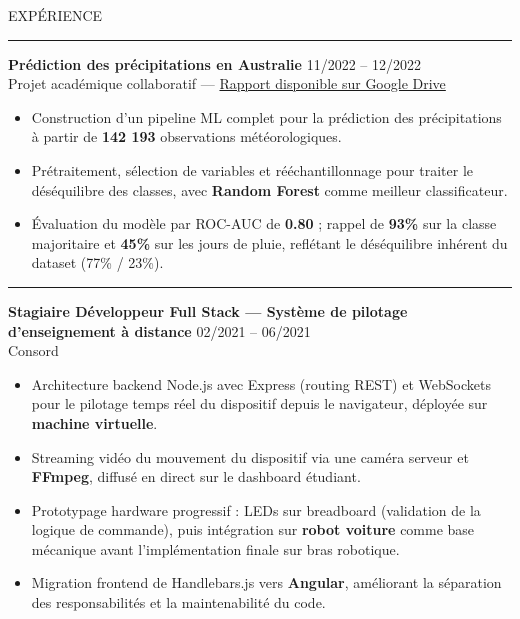 \documentclass{resume}
\begin{document}
\begin{rSection}{EXPÉRIENCE}
\vspace{0.05cm}
\noindent\rule{\textwidth}{0.2pt}
\vspace{0.05cm}

{\bf Prédiction des précipitations en Australie} \hfill {11/2022 -- 12/2022}\\
Projet académique collaboratif — \href{https://drive.google.com/file/d/1Tg2m_nWeunxjzOVvIv6D_lKAPd-I-wrp/view?usp=sharing}{Rapport disponible sur Google Drive}
\begin{itemize}
    \item Construction d’un pipeline ML complet pour la prédiction des précipitations à partir de \textbf{142 193} observations météorologiques.
    \item Prétraitement, sélection de variables et rééchantillonnage pour traiter le déséquilibre des classes, avec \textbf{Random Forest} comme meilleur classificateur.
    \item Évaluation du modèle par ROC-AUC de \textbf{0.80} ; rappel de \textbf{93\%} sur
      la classe majoritaire et \textbf{45\%} sur les jours de pluie,
      reflétant le déséquilibre inhérent du dataset (77\% / 23\%).
\end{itemize}

\vspace{0.05cm}
\noindent\rule{\textwidth}{0.2pt}
\vspace{0.05cm}

{\small\bfseries Stagiaire Développeur Full Stack — Système de pilotage d'enseignement à distance} \hfill {02/2021 -- 06/2021}\\
Consord
\begin{itemize}
    \item Architecture backend Node.js avec Express (routing REST) et WebSockets pour le
          pilotage temps réel du dispositif depuis le navigateur, déployée sur \textbf{machine virtuelle}.
    \item Streaming vidéo du mouvement du dispositif via une caméra serveur et \textbf{FFmpeg},
          diffusé en direct sur le dashboard étudiant.
    \item Prototypage hardware progressif : LEDs sur breadboard (validation de la logique de
          commande), puis intégration sur \textbf{robot voiture} comme base mécanique avant
          l'implémentation finale sur bras robotique.
    \item Migration frontend de Handlebars.js vers \textbf{Angular}, améliorant la séparation
          des responsabilités et la maintenabilité du code.
\end{itemize}


\end{rSection}
\end{document}
